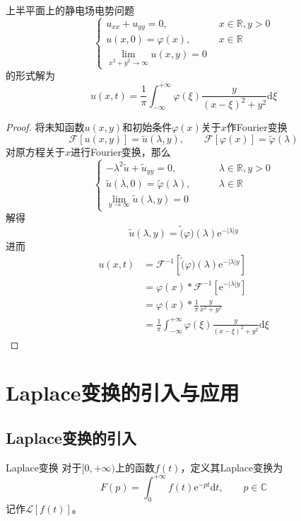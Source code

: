 \documentclass[lang = cn, scheme = chinese, thmcnt = section]{elegantbook}
\newcommand{\R}{\mathbb{R}}            %
\newcommand{\C}{\mathbb{C}}  		   %
\newcommand{\dd}{\mathrm{d}}           %
\newcommand{\ee}[1]{\mathrm{e}^{#1}}   %
\begin{document}
\begin{theorem}
	上半平面上的静电场电势问题
	$$
	\begin{cases}
		u_{xx}+u_{yy}=0,\qquad & x\in\R,y>0\\
		u(x,0)=\varphi(x),\qquad & x\in\R\\
		\lim\limits_{x^2+y^2\to\infty}u(x,y)=0
	\end{cases}
	$$
	的形式解为%
	$$
	u(x,t)
	= \frac{1}{\pi}\int_{-\infty}^{+\infty}\varphi(\xi)\frac{y}{(x-\xi)^2+y^2}\dd\xi
	$$
\end{theorem}

\begin{proof}
	将未知函数$u(x,y)$和初始条件$\varphi(x)$关于$x$作Fourier变换%
	$$
	\mathscr{F}[u(x,y)]=\tilde{u}(\lambda,y),\qquad
	\mathscr{F}[\varphi(x)]=\tilde{\varphi}(\lambda)
	$$
	对原方程关于$x$进行Fourier变换，那么
	$$
	\begin{cases}
		-\lambda^2\tilde{u}+\tilde{u}_{yy}=0,\qquad & \lambda\in\R,y>0\\
		\tilde{u}(\lambda,0)=\tilde{\varphi}(\lambda),\qquad & \lambda\in\R\\
		\lim\limits_{y\to\infty}\tilde{u}(\lambda,y)=0
	\end{cases}
	$$
	解得%
	$$
	\tilde{u}(\lambda,y)
	=\tilde(\varphi)(\lambda)\ee{-|\lambda|y}
	$$
	进而
	\begin{align*}
		u(x,t)
		& = \mathscr{F}^{-1}\left[\tilde(\varphi)(\lambda)\ee{-|\lambda|y}\right]\\
		& = \varphi(x)*\mathscr{F}^{-1}\left[\ee{-|\lambda|y}\right]\\
		& = \varphi(x)*\frac{1}{\pi}\frac{y}{x^2+y^2}\\
		& = \frac{1}{\pi}\int_{-\infty}^{+\infty}\varphi(\xi)\frac{y}{(x-\xi)^2+y^2}\dd\xi
	\end{align*}
\end{proof}

\section{Laplace变换的引入与应用}

\subsection{Laplace变换的引入}

\begin{definition}{Laplace变换}
	对于$[0,+\infty)$上的函数$f(t)$，定义其Laplace变换为%
	$$
	F(p)=\int_{0}^{+\infty}f(t)\ee{-pt}\dd t,\qquad p\in\C
	$$
	记作$\mathscr{L}[f(t)]$。
\end{definition}
\end{document}
